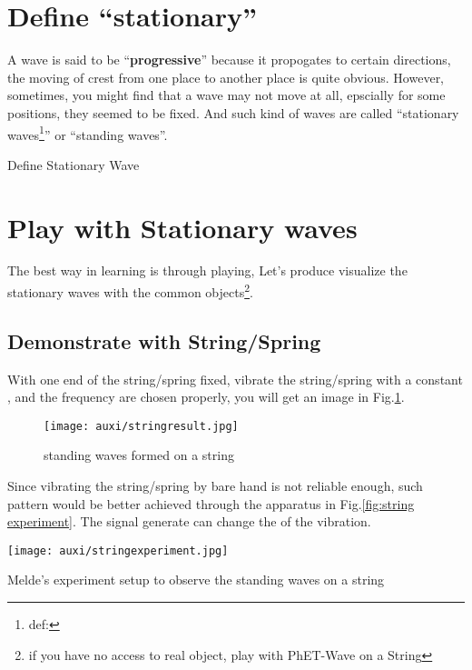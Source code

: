 \documentclass[a4paper]{tufte-handout}
\newenvironment{SummBox}
{\begin{tcolorbox}[breakable,colback=r1!30,colframe=r1,title=Summary]} {\end{tcolorbox}}
\begin{document}
\section{Define ``stationary''}
A wave is said to be ``\textbf{progressive}'' because it propogates to certain directions, the moving of crest from one place to another place is quite obvious. However, sometimes, you might find that a wave may not move at all, epscially for some positions, they seemed to be fixed. And such kind of waves are called ``stationary waves\footnote{def:}'' or ``standing waves''.

\begin{SummBox}
Define Stationary Wave
\vspace{1in}
\end{SummBox}

\section{Play with Stationary waves}
The best way in learning is through playing, Let's produce visualize the stationary waves with the common objects\footnote{if you have no access to real object, play with PhET-Wave on a String}.
\subsection{Demonstrate with String/Spring}
With one end of the string/spring fixed, vibrate the string/spring with a constant \uline{\hspace{1in}}, and the frequency are chosen properly, you will get an image in Fig.\ref{fig:standing wave on string}.

\begin{figure}[h]
\centering
\texttt{[image: auxi/stringresult.jpg]}
\caption{standing waves formed on a string}
\label{fig:standing wave on string}
\end{figure}

Since vibrating the string/spring by bare hand is not reliable enough, such pattern would be better achieved through the apparatus in Fig.\ref{fig:string experiment}. The signal generate can change the \uline{\hspace{1in}} of the vibration. 

\begin{marginfigure}
\texttt{[image: auxi/stringexperiment.jpg]}
\caption{Melde’s experiment setup to observe the standing waves on a string}
\label{fig:string experiment}
\end{marginfigure}
\end{document}
